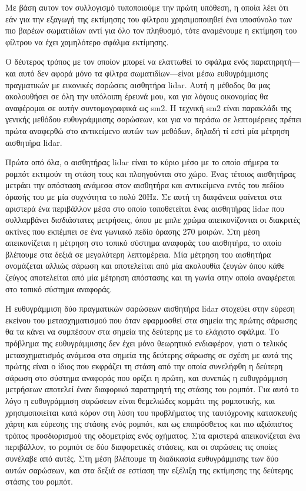 \documentclass[a4paper,10pt]{article}
\begin{document}
Με βάση αυτον τον συλλογισμό τυποποιούμε την πρώτη υπόθεση, η οποία λέει ότι
εάν για την εξαγωγή της εκτίμησης του φίλτρου χρησιμοποιηθεί ένα υποσύνολο των
πιο βαρέων σωματιδίων αντί για όλο τον πληθυσμό, τότε αναμένουμε η εκτίμηση
του φίλτρου να έχει χαμηλότερο σφάλμα εκτίμησης.


Ο δέυτερος τρόπος με τον οποίον μπορεί να ελαττωθεί το σφάλμα ενός
παρατηρητή---και αυτό δεν αφορά μόνο τα φίλτρα σωματιδίων---είναι μέσω
ευθυγράμμισης πραγματικών με εικονικές σαρώσεις αισθητήρα lidar. Αυτή η μέθοδος
θα μας ακολουθήσει σε όλη την υπόλοιπη έρευνά μου, και για λόγους οικονομίας θα
αναφέρομαι σε αυτήν συντομογραφικά ως sm2. Η τεχνική sm2 είναι παρακλάδι της
γενικής μεθόδου ευθυγράμμισης σαρώσεων, και για να περάσω σε λεπτομέρειες
πρέπει πρώτα αναφερθώ στο αντικείμενο αυτών των μεθόδων, δηλαδή τί εστί μία
μέτρηση αισθητήρα lidar.

Πρώτα από όλα, ο αισθητήρας lidar είναι το κύριο μέσο με το οποίο σήμερα τα
ρομπότ εκτιμούν τη στάση τους και πλοηγούνται στο χώρο. Ένας τέτοιος αισθητήρας
μετράει την απόσταση ανάμεσα στον αισθητήρα και αντικείμενα εντός του πεδίου
όρασής του με μία συχνότητα το πολύ 20Hz.  Σε αυτή τη διαφάνεια φαίνεται στα
αριστερά ένα περιβάλλον μέσα στο οποίο τοποθετείται ένας αισθητήρας lidar που
συλλαμβάνει δισδιάστατες μετρήσεις, όπου με μπλε χρώμα απεικονίζονται οι
διακριτές ακτίνες που εκπέμπει σε ένα γωνιακό πεδίο όρασης 270 μοιρών. Στη μέση
απεικονίζεται η μέτρηση στο τοπικό σύστημα αναφοράς του αισθητήρα, το οποίο
βλέπουμε στα δεξιά σε μεγαλύτερη λεπτομέρεια. Μία μέτρηση του αισθητήρα
ονομάζεται αλλιώς σάρωση και αποτελείται από μία ακολουθία ζευγών όπου κάθε
ζεύγος αποτελείται από μία μέτρηση απόστασης και τη γωνία στην οποία αναφέρεται
στο τοπικό σύστημα αναφοράς.

Η ευθυγράμμιση δύο πραγματικών σαρώσεων αισθητήρα lidar στοχεύει στην εύρεση
εκείνου του μετασχηματισμού που όταν εφαρμοσθεί στα σημεία της πρώτης σάρωσης
θα τα κάνει να συμπέσουν στα σημεία της δεύτερης με το ελάχιστο σφάλμα. Το
πρόβλημα της ευθυγράμμισης δεν έχει μόνο θεωρητικό ενδιαφέρον, γιατι ο τελικός
μετασχηματισμός ανάμεσα στα σημεία της δεύτερης σάρωσης σε σχέση με αυτά της
πρώτης είναι ο ίδιος που εκφράζει τη στάση από την οποία συνελήφθη η δεύτερη
σάρωση στο σύστημα αναφοράς που ορίζει η πρώτη, και συνεπώς η ευθυγράμμιση
μετρήσεων αποτελεί έναν διαφορικό παρατηρητή της στάσης του ρομπότ. Για αυτό το
λόγο η ευθυγράμμιση σαρώσεων είναι θεμελιώδες κομμάτι της ρομποτικής, και
χρησιμοποιείται κατά κόρον στη λύση του προβλήματος της ταυτόχρονης κατασκευής
χάρτη και εύρεσης της στάσης ενός ρομπότ, και ως επιπρόσθετος και πιο
αξιόπιστος τρόπος προσδιορισμού της οδομετρίας ενός οχήματος.  Στα
αριστερά απεικονίζεται ένα περιβάλλον, το ρομπότ σε δύο διαφορετικές στάσεις,
και οι σαρώσεις τις οποίες συνέλαβε από αυτές. Στη μέση βλέπουμε τη διαδικασία
ευθυγράμμισης των δύο αυτών σαρώσεων, και στα δεξιά σε εστίαση την εξέλιξη της
εκτίμησης της δεύτερης στάσης του ρομπότ.
\end{document}
